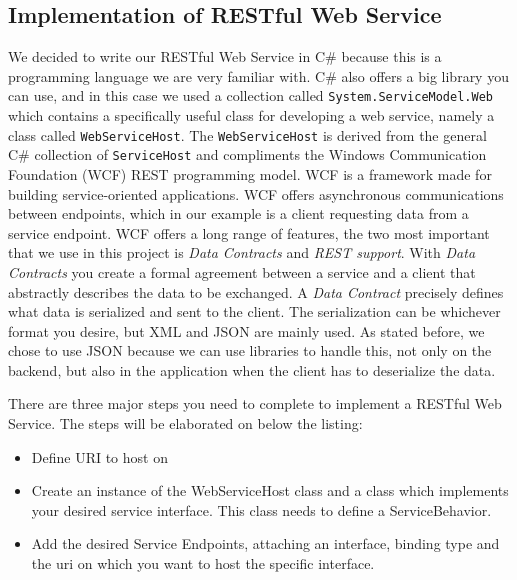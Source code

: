 \subsection{Implementation of RESTful Web Service}
\label{subsec:restImpl}

We decided to write our RESTful Web Service in C\# because this is a programming language we are very familiar with. C\# also offers a big library you can use, and in this case we used a collection called \texttt{System.ServiceModel.Web} which contains a specifically useful class for developing a web service, namely a class called \texttt{WebServiceHost}. The \texttt{WebServiceHost} is derived from the general C\# collection of \texttt{ServiceHost} and compliments the Windows Communication Foundation (WCF) REST programming model\cite{WebServiceHost}.
WCF is a framework made for building service-oriented applications. WCF offers asynchronous communications between endpoints, which in our example is a client requesting data from a service endpoint. WCF offers a long range of features, the two most important that we use in this project is \textit{Data Contracts} and \textit{REST support}\cite{WCF}. 
With \textit{Data Contracts} you create a formal agreement between a service and a client that abstractly describes the data to be exchanged. A \textit{Data Contract} precisely defines what data is serialized and sent to the client. The serialization can be whichever format you desire, but XML and JSON are mainly used. As stated before, we chose to use JSON because we can use libraries to handle this, not only on the backend, but also in the application when the client has to deserialize the data.

There are three major steps you need to complete to implement a RESTful Web Service. The steps will be elaborated on below the listing:
\begin{itemize}
\item Define URI to host on
\item Create an instance of the WebServiceHost class and a class which implements your desired service interface. This class needs to define a ServiceBehavior.
\item Add the desired Service Endpoints, attaching an interface, binding type and the uri on which you want to host the specific interface.
\end{itemize}

